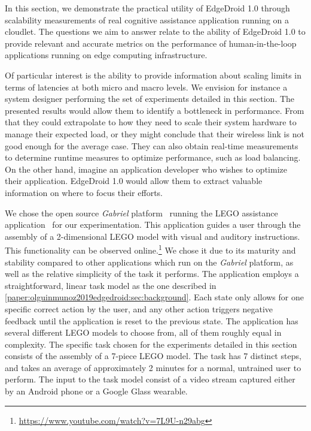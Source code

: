 In this section, we demonstrate the practical utility of EdgeDroid 1.0 through scalability measurements of real cognitive assistance application running on a cloudlet.
The questions we aim to answer relate to the ability of EdgeDroid 1.0 to provide relevant and accurate metrics on the performance of human-in-the-loop applications running on edge computing infrastructure.

Of particular interest is the ability to provide information about scaling limits in terms of latencies at both micro and macro levels.
We envision for instance a system designer performing the set of experiments detailed in this section.
The presented results would allow them to identify a bottleneck in performance.
From that they could extrapolate to how they need to scale their system hardware to manage their expected load, or they might conclude that their wireless link is not good enough for the average case.
They can also obtain real-time measurements to determine runtime measures to optimize performance, such as load balancing.
On the other hand, imagine an application developer who wishes to optimize their application.
EdgeDroid 1.0 would allow them to extract valuable information on where to focus their efforts.


We chose the open source \emph{Gabriel} platform~\cite{ha2014towards} running the LEGO assistance application~\cite{chen2017empirical} for our experimentation.
This application guides a user through the assembly of a 2-dimensional LEGO model with visual and auditory instructions.
This functionality can be observed online.\footnote{\url{https://www.youtube.com/watch?v=7L9U-n29abg}}
We chose it due to its maturity and stability compared to other applications which run on the \emph{Gabriel} platform, as well as the relative simplicity of the task it performs.
The application employs a straightforward, linear task model as the one described in \cref{paper:olguinmunoz2019edgedroid:sec:background}.
Each state only allows for one specific correct action by the user, and any other action triggers negative feedback until the application is reset to the previous state.
The application has several different LEGO models to choose from, all of them roughly equal in complexity.
The specific task chosen for the experiments detailed in this section consists of the assembly of a 7-piece LEGO model.
The task has 7 distinct steps, and takes an average of approximately 2 minutes for a normal, untrained user to perform.
The input to the task model consist of a video stream captured either by an Android phone or a Google Glass wearable.

